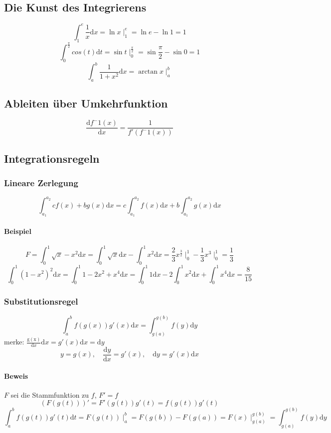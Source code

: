 \documentclass[a4paper]{scrartcl}
\begin{document}
\subsection{Die Kunst des Integrierens}
\label{sec-11-1}
\[\int_1^e \frac{1}{x}\mathrm{d}x = \ln{x}\mid_1^e = \ln{e} - \ln{1} = 1\]
\[\int_0^{\frac{\pi}{2}} cos(t)\mathrm{d}t=\sin{t}\mid_0^{\frac{\pi}{2}} = \sin{\frac{\pi}{2}} - \sin{0} = 1\]
\[\int_a^b\frac{1}{1+x^2}\mathrm{d}x = \arctan{x}\mid_a^b\]
\subsection{Ableiten über Umkehrfunktion}
\label{sec-11-2}
\[\frac{\mathrm{d}f^-1(x)}{\mathrm{d}x}=\frac{1}{f'(f^-1(x))}\]
\subsection{Integrationsregeln}
\label{sec-11-3}
\subsubsection{Lineare Zerlegung}
\label{sec-11-3-1}
\[\int_{a_1}^{a_2} c f(x) + b g(x)\mathrm{d}x = c\int_{a_1}^{a_2}f(x)\mathrm{d}x + b\int_{a_1}^{a_2}g(x)\mathrm{d}x\]
\paragraph{Beispiel}
\label{sec-11-3-1-1}
\[F=\int_0^1 \sqrt{x} - x^2\mathrm{d}x = \int_0^1 \sqrt{x}\mathrm{d}x - \int_0^1 x^2\mathrm{d}x = \frac{2}{3}x^\frac{3}{2}\mid_0^1 - \frac{1}{3}x^3\mid_0^1 = \frac{1}{3}\]
\[\int_0^1 (1-x^2)^2\mathrm{d}x = \int_0^1 1-2x^2 + x^4\mathrm{d}x = \int_0^1 1\mathrm{d}x - 2\int_0^1 x^2\mathrm{d}x + \int_0^1 x^4\mathrm{d}x = \frac{8}{15}\]
\subsubsection{Substitutionsregel}
\label{sec-11-3-2}
\[\int_a^b f(g(x))g'(x)\mathrm{d}x=\int_{g(a)}^{g(b)}f(y)\mathrm{d}y\]
merke: $\frac{\mathrm{g(x)}}{\mathrm{d}x} \mathrm{d}x = g'(x)\mathrm{d}x = \mathrm{d}y$
\[y=g(x),\quad\frac{\mathrm{d}y}{\mathrm{d}x}=g'(x),\quad\mathrm{d}y = g'(x)\mathrm{d}x\]
\paragraph{Beweis}
\label{sec-11-3-2-1}
$F$ sei die Stammfunktion zu $f$, $F' = f$
\[(F(g(t)))' = F'(g(t))g'(t) = f(g(t))g'(t)\]
\[\int_a^b f(g(t))g'(t)\mathrm{d}t = F(g(t))\mid_a^b=F(g(b)) - F(g(a)) = F(x)\mid_{g(a)}^{g(b)} = \int_{g(a)}^{g(b)}f(y)\mathrm{d}y\]
\end{document}
